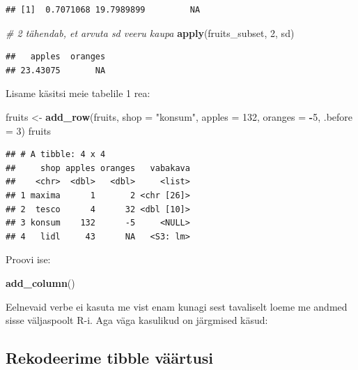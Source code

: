 \documentclass[]{book}
\newenvironment{Shaded}{\begin{snugshade}}{\end{snugshade}}
\newcommand{\KeywordTok}[1]{\textcolor[rgb]{0.13,0.29,0.53}{\textbf{#1}}}
\newcommand{\DataTypeTok}[1]{\textcolor[rgb]{0.13,0.29,0.53}{#1}}
\newcommand{\DecValTok}[1]{\textcolor[rgb]{0.00,0.00,0.81}{#1}}
\newcommand{\StringTok}[1]{\textcolor[rgb]{0.31,0.60,0.02}{#1}}
\newcommand{\CommentTok}[1]{\textcolor[rgb]{0.56,0.35,0.01}{\textit{#1}}}
\newcommand{\OperatorTok}[1]{\textcolor[rgb]{0.81,0.36,0.00}{\textbf{#1}}}
\newcommand{\NormalTok}[1]{#1}
\begin{document}
\begin{verbatim}
## [1]  0.7071068 19.7989899         NA
\end{verbatim}

\begin{Shaded}
\begin{Highlighting}[]
\CommentTok{# 2 tähendab, et arvuta sd veeru kaupa}
\KeywordTok{apply}\NormalTok{(fruits_subset, }\DecValTok{2}\NormalTok{, sd) }
\end{Highlighting}
\end{Shaded}

\begin{verbatim}
##   apples  oranges 
## 23.43075       NA
\end{verbatim}

Lisame käsitsi meie tabelile 1 rea:

\begin{Shaded}
\begin{Highlighting}[]
\NormalTok{fruits <-}\StringTok{ }\KeywordTok{add_row}\NormalTok{(fruits, }
                  \DataTypeTok{shop =} \StringTok{"konsum"}\NormalTok{, }
                  \DataTypeTok{apples =} \DecValTok{132}\NormalTok{, }
                  \DataTypeTok{oranges =} \OperatorTok{-}\DecValTok{5}\NormalTok{, }
                  \DataTypeTok{.before =} \DecValTok{3}\NormalTok{)}
\NormalTok{fruits}
\end{Highlighting}
\end{Shaded}

\begin{verbatim}
## # A tibble: 4 x 4
##     shop apples oranges   vabakava
##    <chr>  <dbl>   <dbl>     <list>
## 1 maxima      1       2 <chr [26]>
## 2  tesco      4      32 <dbl [10]>
## 3 konsum    132      -5     <NULL>
## 4   lidl     43      NA   <S3: lm>
\end{verbatim}

Proovi ise:

\begin{Shaded}
\begin{Highlighting}[]
\KeywordTok{add_column}\NormalTok{()}
\end{Highlighting}
\end{Shaded}

Eelnevaid verbe ei kasuta me vist enam kunagi sest tavaliselt loeme me
andmed sisse väljaspoolt R-i. Aga väga kasulikud on järgmised käsud:

\subsection{Rekodeerime tibble
väärtusi}\label{rekodeerime-tibble-vaartusi}
\end{document}
